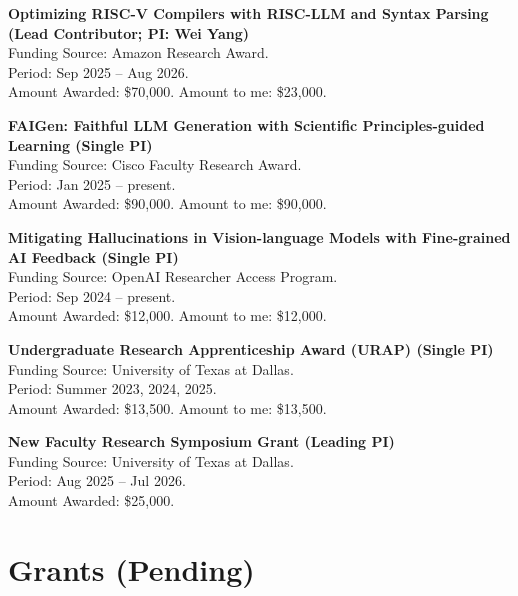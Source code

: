 \noindent \textbf{Optimizing RISC-V Compilers with RISC-LLM and Syntax Parsing (Lead Contributor; PI: Wei Yang)} \\
\indent Funding Source: Amazon Research Award. \\
\indent Period: Sep 2025 – Aug 2026. \\
\indent Amount Awarded: \$70,000. Amount to me: \$23,000.

\noindent \textbf{FAIGen: Faithful LLM Generation with Scientific Principles-guided Learning (Single PI)}  \\
\indent Funding Source: Cisco Faculty Research Award. \\
\indent Period: Jan 2025 -- present. \\
\indent Amount Awarded: \$90,000. Amount to me: \$90,000.


\noindent \textbf{Mitigating Hallucinations in Vision-language Models with Fine-grained AI Feedback (Single PI)}  \\
\indent Funding Source: OpenAI Researcher Access Program. \\
\indent Period: Sep 2024 -- present. \\
\indent Amount Awarded: \$12,000. Amount to me: \$12,000.


\noindent \textbf{Undergraduate Research Apprenticeship Award (URAP) (Single PI)} \\
\indent Funding Source: University of Texas at Dallas. \\
\indent Period: Summer 2023, 2024, 2025. \\
\indent Amount Awarded: \$13,500. Amount to me: \$13,500. 

\noindent \textbf{New Faculty Research Symposium Grant (Leading PI)} \\
\indent Funding Source: University of Texas at Dallas. \\
\indent Period: Aug 2025 -- Jul 2026. \\
\indent Amount Awarded: \$25,000. \\


\section{Grants (Pending)}



